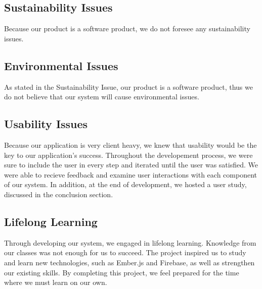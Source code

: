 \subsection{Sustainability Issues}
\par Because our product is a software product, we do not foresee any sustainability issues.
\subsection{Environmental Issues}
\par As stated in the Sustainability Issue, our product is a software product, thus we do not believe that our system will cause environmental issues.
\subsection{Usability Issues}
\par Because our application is very client heavy, we knew that usability would be the key to our application's success. Throughout the developement process, we were sure to include the user in every step and iterated until the user was satisfied. We were able to recieve feedback and examine user interactions with each component of our system. In addition, at the end of development, we hosted a user study, discussed in the conclusion section. 
\subsection{Lifelong Learning}
Through developing our system, we engaged in lifelong learning. Knowledge from our classes was not enough for us to succeed. The project inspired us to study and learn new technologies, such as Ember.js and Firebase, as well as strengthen our existing skills. By completing this project, we feel prepared for the time where we must learn on our own. 
